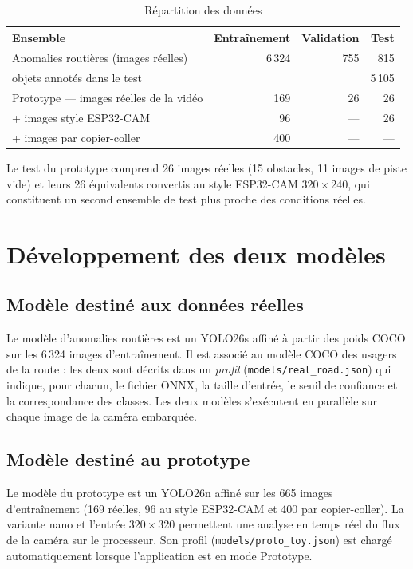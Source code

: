 \begin{table}[H]
\centering\small
\caption{Répartition des données}
\label{tab:split}
\begin{tabular}{lrrr}
\toprule
\textbf{Ensemble} & \textbf{Entraînement} & \textbf{Validation} & \textbf{Test} \\
\midrule
Anomalies routières (images réelles) & 6\,324 & 755 & 815 \\
\quad objets annotés dans le test & & & 5\,105 \\
Prototype — images réelles de la vidéo & 169 & 26 & 26 \\
\quad + images style ESP32-CAM & 96 & — & 26 \\
\quad + images par copier-coller & 400 & — & — \\
\bottomrule
\end{tabular}
\end{table}

Le test du prototype comprend 26 images réelles (15 obstacles, 11 images de piste vide) et leurs 26 équivalents
convertis au style ESP32-CAM 320\,$\times$\,240, qui constituent un second ensemble de test plus proche des
conditions réelles.

\section{Développement des deux modèles}

\subsection{Modèle destiné aux données réelles}
Le modèle d'anomalies routières est un YOLO26s affiné à partir des poids COCO sur les 6\,324 images
d'entraînement. Il est associé au modèle COCO des usagers de la route : les deux sont décrits dans un \emph{profil}
(\texttt{models/real\_road.json}) qui indique, pour chacun, le fichier ONNX, la taille d'entrée, le seuil de
confiance et la correspondance des classes. Les deux modèles s'exécutent en parallèle sur chaque image de la
caméra embarquée.

\subsection{Modèle destiné au prototype}
Le modèle du prototype est un YOLO26n affiné sur les 665 images d'entraînement (169 réelles, 96 au style
ESP32-CAM et 400 par copier-coller). La variante nano et l'entrée 320\,$\times$\,320 permettent une analyse en
temps réel du flux de la caméra sur le processeur. Son profil (\texttt{models/proto\_toy.json}) est chargé
automatiquement lorsque l'application est en mode Prototype.

